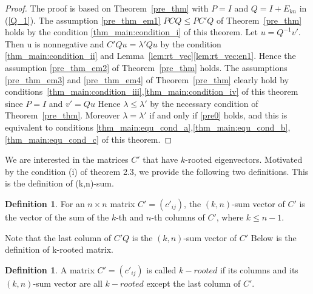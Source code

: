 \documentclass{article}
\theoremstyle{plain}
\theoremstyle{definition}
\newtheorem{defn}[thm]{Definition}
\begin{document}
   
\begin{proof}
    The proof is based on Theorem~\ref{pre_thm} with $P = I$ and $Q = I + E_{kn}$ in (\ref{Q_1}). 
    The assumption \ref{pre_thm_em1} $PCQ\leq PC'Q$ of Theorem~\ref{pre_thm} holds by the condition \ref{thm_main:condition_i} of this theorem. 
    Let $u = Q^{-1}v'$. Then u is nonnegative and $C'Qu = \lambda' Qu$ by the condition \ref{thm_main:condition_ii} and
     Lemma~\ref{lem:rt_vec}\ref{lem:rt_vec:en1}. Hence the assumption \ref{pre_thm_em2} of Theorem~\ref{pre_thm} holds. The assumptions \ref{pre_thm_em3} and \ref{pre_thm_em4}
      of Theorem~\ref{pre_thm} clearly hold by conditions~\ref{thm_main:condition_iii},\ref{thm_main:condition_iv} of this theorem since $P = I$ and
       $v'= Qu$  Hence $\lambda \leq \lambda' $ by the necessary condition of Theorem~\ref{pre_thm}. Moreover
        $\lambda = \lambda'$ if and only if \ref{pre0} holds, and this is equivalent to
         conditions \ref{thm_main:equ_cond_a},\ref{thm_main:equ_cond_b},\ref{thm_main:equ_cond_c} of this theorem. 
\end{proof}   
    
We are interested in the matrices $C'$ that have $k$-rooted eigenvectors.
Motivated by the condition (i) of theorem 2.3, we provide the following two definitions. 
This is the definition of (k,n)-sum.
\begin{defn}
    For an $n \times n$ matrix $C'=(c'_{ij})$, the $(k, n)$-sum vector of $C'$ is the vector of the sum of the $k$-th and  $n$-th columns of $C'$, where $k\leq n-1$.
\end{defn}

Note that the last column of $C'Q$ is the $(k, n)$-sum vector of $C'$
Below is the definition of k-rooted matrix.
\begin{defn}\label{m_rooted}
    A  matrix $C'=(c'_{ij})$ is called $k-rooted$  if its  columns and its $(k, n)$-sum vector are all $k-rooted$ except the last column of $C'$.
\end{defn}
\end{document}
